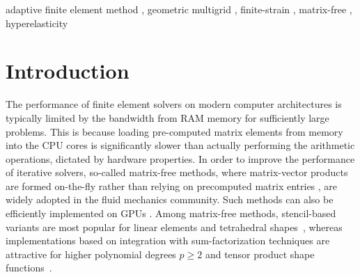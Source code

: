 \documentclass[AMA,STIX1COL]{WileyNJD-v2}
\begin{document}
\begin{frontmatter}

  \maketitle

\else

    \begin{keyword}
        adaptive finite element method \sep
        geometric multigrid \sep
        finite-strain \sep
        matrix-free \sep
        hyperelasticity
    \end{keyword}

\end{frontmatter}
\fi

\section{Introduction}

The performance of finite element solvers on modern computer architectures is typically {\color{red} limited by the bandwidth from RAM memory} for sufficiently large problems.
{\color{red}This is because} loading pre-computed matrix elements from memory into the CPU cores is significantly slower than actually performing the arithmetic operations{\color{red}, dictated by hardware properties}.
In order to improve the performance of iterative solvers, so-called matrix-free methods,
where matrix-vector products are formed on-the-fly rather than relying on precomputed matrix entries \cite{Brown2010,kronbichler12,May2015, Krank2017,  Gmeiner2016},
are widely adopted in the fluid mechanics community.
Such methods can also be efficiently implemented on GPUs \cite{Abdelfattah2016, ljungkvist2017multigrid}.
{\color{red}
Among matrix-free methods, stencil-based variants are most popular for linear elements and tetrahedral shapes~\cite{Gmeiner2016,Bauer2018}, whereas implementations based on integration with sum-factorization techniques are attractive for higher polynomial degrees $p\geq 2$ and tensor product shape functions~\cite{Brown2010,kronbichler12,May2015,Cantwell2011}.
}
\end{document}
